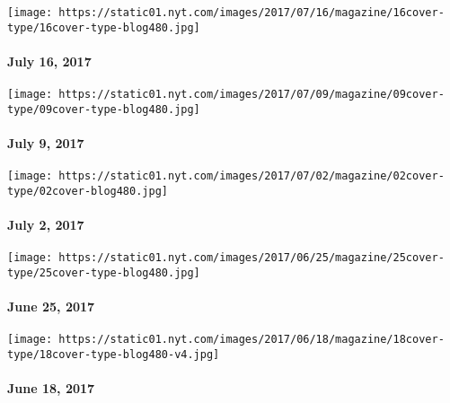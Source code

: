 \href{https://www.nytimes.com/issue/magazine/2017/07/14/magazine-index-20170716}{}

\texttt{[image: https://static01.nyt.com/images/2017/07/16/magazine/16cover-type/16cover-type-blog480.jpg]}

\hypertarget{july-16-2017}{%
\paragraph{July 16, 2017}\label{july-16-2017}}

\href{https://www.nytimes.com/issue/magazine/2017/07/07/magazine-index-20170709}{}

\texttt{[image: https://static01.nyt.com/images/2017/07/09/magazine/09cover-type/09cover-type-blog480.jpg]}

\hypertarget{july-9-2017}{%
\paragraph{July 9, 2017}\label{july-9-2017}}

\href{https://www.nytimes.com/issue/magazine/2017/06/30/magazine-index-20170702}{}

\texttt{[image: https://static01.nyt.com/images/2017/07/02/magazine/02cover-type/02cover-blog480.jpg]}

\hypertarget{july-2-2017}{%
\paragraph{July 2, 2017}\label{july-2-2017}}

\href{https://www.nytimes.com/issue/magazine/2017/06/23/magazine-index-20170625}{}

\texttt{[image: https://static01.nyt.com/images/2017/06/25/magazine/25cover-type/25cover-type-blog480.jpg]}

\hypertarget{june-25-2017}{%
\paragraph{June 25, 2017}\label{june-25-2017}}

\href{https://www.nytimes.com/issue/magazine/2017/06/16/magazine-index-20170618}{}

\texttt{[image: https://static01.nyt.com/images/2017/06/18/magazine/18cover-type/18cover-type-blog480-v4.jpg]}

\hypertarget{june-18-2017}{%
\paragraph{June 18, 2017}\label{june-18-2017}}

